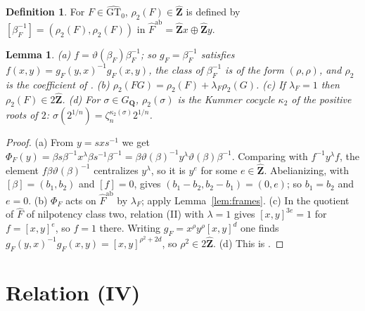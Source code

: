 \documentclass[11pt,a4paper]{article}
\theoremstyle{plain}
\newtheorem{lemma}[theorem]{Lemma}
\theoremstyle{definition}
\newtheorem{definition}[theorem]{Definition}
\theoremstyle{remark}
\newcommand{\GTz}{\widehat{\mathrm{GT}}_0}
\newcommand{\Zh}{\widehat{\mathbf Z}}
\newcommand{\GQ}{G_{\mathbf Q}}
\newcommand{\Fh}{\widehat F}
\newcommand{\ab}{\mathrm{ab}}
\begin{document}
\begin{definition}\label{def:rho}
For $F\in\GTz$, $\rho_2(F)\in\Zh$ is defined by $[\beta_F^{-1}]=(\rho_2(F),\rho_2(F))$ in
$\Fh^{\ab}=\Zh x\oplus\Zh y$.
\end{definition}

\begin{lemma}\label{lem:rho}
\textup{(a)} $f=\vartheta(\beta_F)\beta_F^{-1}$; so $g_F=\beta_F^{-1}$ satisfies $f(x,y)=g_F(y,x)^{-1}g_F(x,y)$, the
class of $\beta_F^{-1}$ is of the form $(\rho,\rho)$, and $\rho_2$ is the coefficient of \cite[Definition 5.1]{NS}.
\textup{(b)} $\rho_2(FG)=\rho_2(F)+\lambda_F\rho_2(G)$.
\textup{(c)} If $\lambda_F=1$ then $\rho_2(F)\in2\Zh$.
\textup{(d)} For $\sigma\in\GQ$, $\rho_2(\sigma)$ is the Kummer cocycle $\kappa_2$ of the positive roots of $2$:
$\sigma(2^{1/n})=\zeta_n^{\kappa_2(\sigma)}2^{1/n}$.
\end{lemma}

\begin{proof}
(a) From $y=sxs^{-1}$ we get
$\Phi_F(y)=\beta s\beta^{-1}x^\lambda\beta s^{-1}\beta^{-1}
=\beta\vartheta(\beta)^{-1}y^\lambda\vartheta(\beta)\beta^{-1}$. Comparing with $f^{-1}y^\lambda f$, the element
$f\beta\vartheta(\beta)^{-1}$ centralizes $y^\lambda$, so it is $y^e$ for some $e\in\Zh$. Abelianizing, with
$[\beta]=(b_1,b_2)$ and $[f]=0$, gives $(b_1-b_2,b_2-b_1)=(0,e)$; so $b_1=b_2$ and $e=0$.
(b) $\Phi_F$ acts on $\Fh^{\ab}$ by $\lambda_F$; apply Lemma~\ref{lem:frames}.
(c) In the quotient of $\Fh$ of nilpotency class two, relation (II) with $\lambda=1$ gives $[x,y]^{3e}=1$ for
$f=[x,y]^e$, so $f=1$ there. Writing $g_F=x^\rho y^\rho[x,y]^d$ one finds
$g_F(y,x)^{-1}g_F(x,y)=[x,y]^{\rho^2+2d}$, so $\rho^2\in2\Zh$.
(d) This is \cite[\S5, after Definition 5.1]{NS}.
\end{proof}

\section{Relation (IV)}\label{sec:IV}
\end{document}
